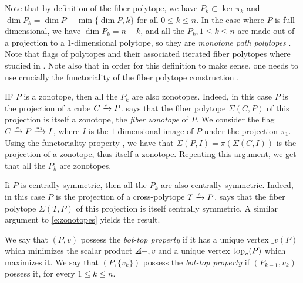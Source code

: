 Note that by definition of the fiber polytope, we have $P_k \subset \ker \pi_k$ and $\dim P_k = \dim P - \min\{ \dim P,k\}$ for all $0\leq k \leq n$.
In the case where $P$ is full dimensional, we have $\dim P_k = n-k$, and all the $P_k, 1 \leq k \leq n$ are made out of a projection to a 1-dimensional polytope, so they are \emph{monotone path polytopes} \cite[Theorem 5.3]{BilleraSturmfels92}.
Note that flags of polytopes and their associated iterated fiber polytopes where studied in \cite{BilleraSturmfels94}.
Note also that in order for this definition to make sense, one needs to use crucially the functoriality of the fiber polytope construction \cite[Lemma 2.3]{BilleraSturmfels92}.

\begin{example}	\label{e:zonotopes}
	IF $P$ is a zonotope, then all the $P_k$ are also zonotopes.
	Indeed, in this case $P$ is the projection of a cube $C \xrightarrow{\pi} P$.
	\cite[Theorem 4.1]{BilleraSturmfels92} says that the fiber polytope $\Sigma(C,P)$ of this projection is itself a zonotope, the \emph{fiber zonotope} of $P$.
	We consider the flag $C \xrightarrow{\pi} P \xrightarrow{\pi_1} I$, where $I$ is the $1$-dimensional image of $P$ under the projection $\pi_1$.
	Using the functoriality property \cite[Lemma 2.3]{BilleraSturmfels92}, we have that $\Sigma(P,I)=\pi(\Sigma(C,I))$ is the projection of a zonotope, thus itself a zonotope.
	Repeating this argument, we get that all the $P_k$ are zonotopes.
\end{example}

\begin{example}	\label{e:centrally-symmetric}
	Ii $P$ is centrally symmetric, then all the $P_k$ are also centrally symmetric.
	Indeed, in this case $P$ is the projection of a cross-polytope $T \xrightarrow{\pi} P$.
	\cite[Theorem 5.1]{BilleraSturmfels92} says that the fiber polytope $\Sigma(T,P)$ of this projection is itself centrally symmetric.
	A similar argument to \cref{e:zonotopes} yields the result.
\end{example}

\begin{definition}
	We say that $(P,v)$ possess the \emph{bot-top property} if it has a unique vertex $\bm_v(P)$ which minimizes the scalar product $\angles{-,v}$ and a unique vertex $\operatorname{top}_v(P)$ which maximizes it.
	We say that $(P,\{v_k\})$ possess the \emph{bot-top property} if $(P_{k-1}, v_k)$ possess it, for every $1\leq k \leq n$.
\end{definition}

